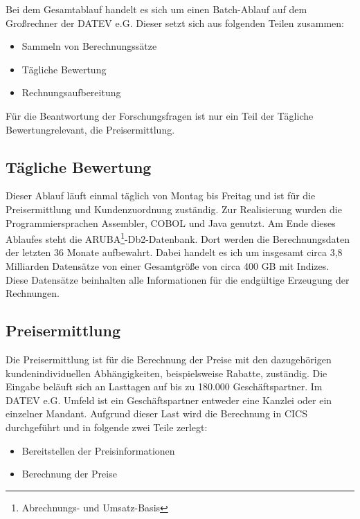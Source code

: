 Bei dem Gesamtablauf handelt es sich um einen Batch-Ablauf auf dem Großrechner der DATEV e.G.
Dieser setzt sich aus folgenden Teilen zusammen:
\begin{itemize}
\item Sammeln von Berechnungssätze
\item Tägliche Bewertung
\item Rechnungsaufbereitung
\end{itemize}
Für die Beantwortung der Forschungsfragen ist nur ein Teil der \glqq Tägliche Bewertung\grqq relevant, die Preisermittlung.

\subsection{Tägliche Bewertung}\label{sssec:täglbew}
Dieser Ablauf läuft einmal täglich von Montag bis Freitag und ist für die Preisermittlung und Kundenzuordnung zuständig.
Zur Realisierung wurden die Programmiersprachen Assembler, COBOL und Java genutzt.
Am Ende dieses Ablaufes steht die ARUBA\footnote{Abrechnungs- und Umsatz-Basis}-Db2-Datenbank.
Dort werden die Berechnungsdaten der letzten 36 Monate aufbewahrt.
Dabei handelt es ich um insgesamt circa 3,8 Milliarden Datensätze von einer Gesamtgröße von circa 400 GB mit Indizes.
Diese Datensätze beinhalten alle Informationen für die endgültige Erzeugung der Rechnungen.

\subsection{Preisermittlung}\label{ssec:preis}
Die Preisermittlung ist für die Berechnung der Preise mit den dazugehörigen kundenindividuellen Abhängigkeiten, beispielsweise Rabatte, zuständig.
Die Eingabe beläuft sich an Lasttagen auf bis zu 180.000 Geschäftspartner.
Im DATEV e.G. Umfeld ist ein Geschäftspartner entweder eine Kanzlei oder ein einzelner Mandant.
Aufgrund dieser Last wird die Berechnung in CICS durchgeführt und in folgende zwei Teile zerlegt:
\begin{itemize}
\item Bereitstellen der Preisinformationen
\item Berechnung der Preise
\end{itemize}
